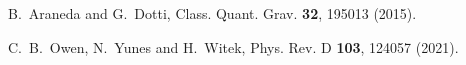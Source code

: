 \documentclass[preprint,aps,tightenlines,showkeys,nofootinbib,superscriptaddress]{revtex4}
\begin{document}
\begin{thebibliography}{999}
B.~Araneda and G.~Dotti,
Class. Quant. Grav. \textbf{32},
195013 (2015).

C.~B.~Owen, N.~Yunes and H.~Witek,
Phys. Rev. D \textbf{103}, %
124057 (2021).




\end{thebibliography}
\end{document}
